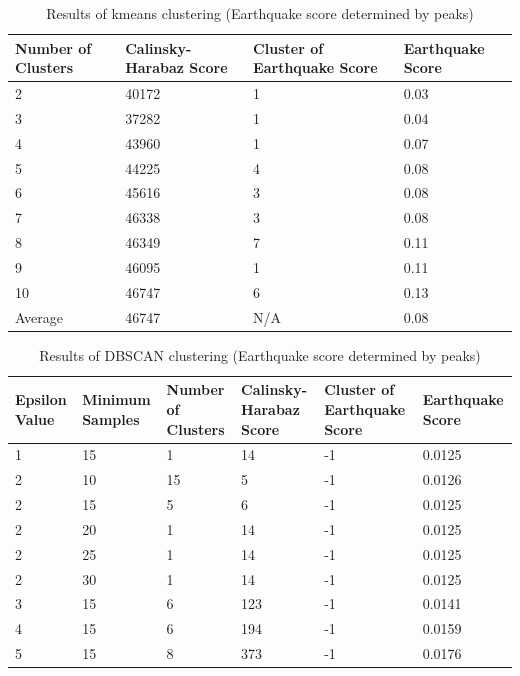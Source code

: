 \documentclass[colorlinks=true,pdfstartview=FitV,linkcolor=blue,
            citecolor=red,urlcolor=magenta]{ligodoc}
\begin{document}
\begin{table}[h!]
\centering
 \begin{tabular}{| m{3.5cm} m{3.5cm} m{3.5cm} m{3.5cm}|} 
 \hline
 Number of Clusters & Calinsky-Harabaz Score & Cluster of Earthquake Score & Earthquake Score\\ [0.5ex] 
 \hline\hline 
 2 & 40172 & 1 & 0.03\\ 
 \hline
 3 & 37282 & 1 & 0.04\\
 \hline
 4 & 43960 & 1 & 0.07\\
 \hline
 5 & 44225 & 4 & 0.08\\
 \hline
 6 & 45616 & 3 & 0.08\\ 
 \hline
 7 & 46338 & 3 & 0.08\\
 \hline
 8 & 46349 & 7 & 0.11\\
 \hline
 9 & 46095 & 1 & 0.11\\
 \hline
 10 & 46747 & 6 & 0.13\\
 \hline
 Average & 46747 & N/A & 0.08\\
 \hline
 \end{tabular}
 \caption{Results of kmeans clustering (Earthquake score determined by peaks)}
 \label{Table 3}
\end{table}

\begin{table}[h!]
\centering
 \begin{tabular}{|m{2cm} m{2.25cm} m{2.25cm} m{2.25cm} m{2.25cm} m{2.25cm}|} 
 \hline
 Epsilon Value & Minimum Samples & Number of Clusters & Calinsky-Harabaz Score & Cluster of Earthquake Score & Earthquake Score\\ [0.5ex] 
 \hline\hline
 1 & 15 & 1 & 14 & -1 & 0.0125\\ 
 \hline
 2 & 10 & 15  & 5 & -1 & 0.0126\\
 \hline
 2 & 15 & 5 & 6 & -1 & 0.0125\\ 
 \hline
 2 & 20 & 1 & 14 & -1 & 0.0125\\
 \hline
 2 & 25 & 1 & 14 & -1 & 0.0125\\
 \hline
 2 & 30 & 1 & 14 & -1 & 0.0125\\
 \hline
 3 & 15 & 6 & 123 & -1 & 0.0141\\
 \hline
 4 & 15 & 6 & 194 & -1 & 0.0159\\
 \hline
 5 & 15 & 8 & 373 & -1 & 0.0176\\
 \hline
 \end{tabular}
 \caption{Results of DBSCAN clustering (Earthquake score determined by peaks)}
 \label{Table 4}
\end{table}
\end{document}
